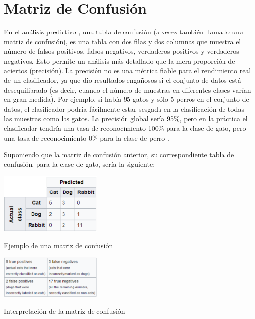 \section{Matriz de Confusión}
En el análisis predictivo , una tabla de confusión (a veces también llamado
una matriz de confusión), es una tabla con dos filas y dos columnas que muestra el número
de falsos positivos, falsos negativos, verdaderos positivos y verdaderos negativos. Esto
permite un análisis más detallado que la mera proporción de aciertos (precisión). La
precisión no es una métrica fiable para el rendimiento real de un clasificador, ya que dio
resultados engañosos si el conjunto de datos está desequilibrado (es decir, cuando el
número de muestras en diferentes clases varían en gran medida). Por ejemplo, si había 95
gatos y sólo 5 perros en el conjunto de datos, el clasificador podría fácilmente estar
sesgada en la clasificación de todas las muestras como los gatos. La precisión global sería 95\%, pero en la práctica el clasificador tendría una tasa de reconocimiento 100\% para la
clase de gato, pero una tasa de reconocimiento 0\% para la clase de perro \cite{30Mconfusion}.

Suponiendo que la matriz de confusión anterior, su correspondiente tabla de
confusión, para la clase de gato, sería la siguiente:

\begin{table}[!htb]
    \centering
    \includegraphics[width=50mm]{Imagenes/matriz_confusion.png}
    \caption{Ejemplo de una matriz de confusión}
    \label{tab:matriz_confusion}
   \vspace{0.5cm}
    \includegraphics[width=50mm]{Imagenes/interpretacion_matriz_confusion.png}
    \caption{Interpretación de la matriz de confusión}
    \label{tab:inter_matriz_confusion}
    
\end{table}




